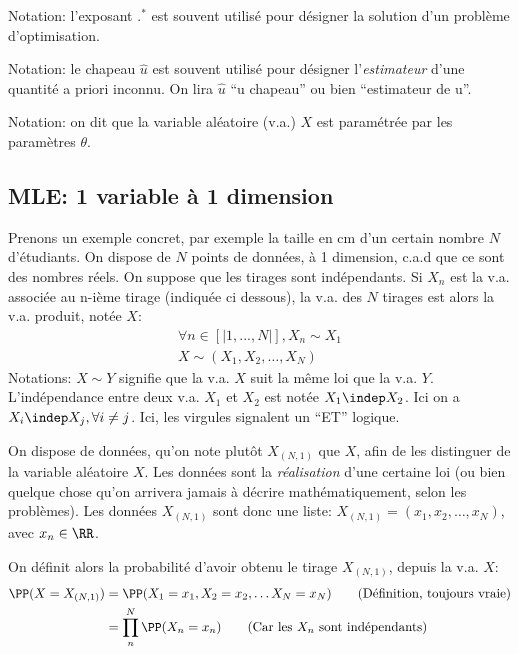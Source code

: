 \documentclass[french,twoside]{article}
\begin{document}
Notation: l'exposant $.^*$ est souvent utilisé pour désigner la solution d'un problème d'optimisation.

Notation: le chapeau $\hat{u}$ est souvent utilisé pour désigner l'\textit{estimateur} d'une quantité a priori inconnu. On lira $\hat{u}$ ``u chapeau'' ou bien ``estimateur de u''.


Notation: on dit que la variable aléatoire (v.a.) $X$ est paramétrée par les paramètres $\theta$.

\subsection{MLE: 1 variable à 1 dimension}
\label{sec:MLE1variable}


Prenons un exemple concret, par exemple la taille en cm d'un certain nombre $N$ d'étudiants.
On dispose de $N$ points de données, à 1 dimension, c.a.d que ce sont des nombres réels.
On suppose que les tirages sont indépendants.
Si $X_n$ est la v.a. associée au n-ième tirage (indiquée ci dessous), la v.a. des $N$ tirages est alors la v.a. produit, notée $X$:
\begin{align}
\forall n \in  [|1,...,N|], X_n \sim X_1 \\
X \sim (X_1,X_2,\ldots, X_N)
\end{align}
Notations: $X \sim Y $ signifie que la v.a. $X$ suit la même loi que la v.a. $Y$.
L'indépendance entre deux v.a. $X_1$ et $X_2$ est notée $X_1 \indep X_2$. Ici on a $X_i\indep X_j, \forall i\neq j$.
Ici, les virgules signalent un ``ET'' logique.

On dispose de données, qu'on note plutôt $X_{(N,1)}$ que $X$, afin de les distinguer de la variable aléatoire $X$. Les données sont la \textit{réalisation} d'une certaine loi (ou bien quelque chose qu'on arrivera jamais à décrire mathématiquement, selon les problèmes).
Les données $X_{(N,1)}$ sont donc une liste: $X_{(N,1)} = (x_1,x_2,\ldots, x_N)$, avec $x_n\in \RR$.

On définit alors la probabilité d'avoir obtenu le tirage $X_{(N,1)}$, depuis la v.a. $X$:
\begin{align}
\PP(X= X_{(N,1)}) 
&=\PP(X_1 =x_1, X_2 =x_2, \ldots X_N =x_N  ) \qquad \text{(Définition, toujours vraie)} \\
&=  \prod_n^N \PP(X_n =x_n) \qquad \text{(Car les $X_n$ sont indépendants)}
\end{align}
\end{document}
